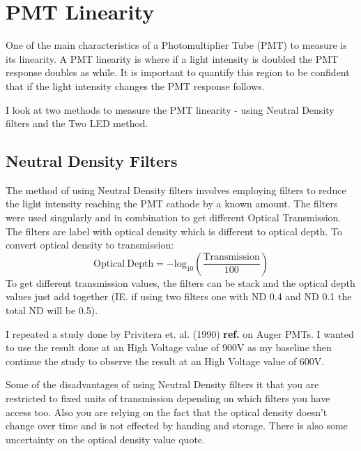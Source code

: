 \section{PMT Linearity}

One of the main characteristics of a Photomultiplier Tube (PMT) to measure is its linearity. A PMT linearity is where if a light intensity is doubled the PMT response doubles as while. It is important to quantify this region to be confident that if the light intensity changes the PMT response follows.

I look at two methods to measure the PMT linearity - using Neutral Density filters and the Two LED method.

\subsection{Neutral Density Filters}

The method of using Neutral Density filters involves employing filters to reduce the light intensity reaching the PMT cathode by a known amount. The filters were used singularly and in combination to get different Optical Transmission. The filters are label with optical density which is different to optical depth. To convert optical density to transmission:
\begin{equation}
\mathrm{Optical \ Depth} = - \mathrm{log}_{10}\left(\frac{\mathrm{Transmission}}{100} \right)
\end{equation}
To get different transmission values, the filters can be stack and the optical depth values just add together (IE. if using two filters one with ND 0.4 and ND 0.1 the total ND will be 0.5).

I repeated a study done by Privitera et. al. (1990) \textbf{ref.} on Auger PMTs. I wanted to use the result done at an High Voltage value of 900V as my baseline then continue the study to observe the result at an High Voltage value of 600V.

Some of the disadvantages of using Neutral Density filters it that you are restricted to fixed units of transmission depending on which filters you have access too. Also you are relying on the fact that the optical density doesn't change over time and is not effected by handing and storage. There is also some uncertainty on the optical density value quote.

